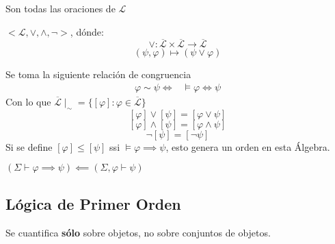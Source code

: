 \begin{defn}
	Son todas las oraciones de $\mathcal{L}$
\end{defn}

\begin{defn}
	$<\mathcal{L},\vee,\wedge,\neg>$, dónde:
	\[\vee:\overline{\mathcal{L}}\times\overline{\mathcal{L}}\rightarrow\overline{\mathcal{L}}\]
	\[(\psi,\varphi)\mapsto(\psi\vee\varphi)\]
\end{defn}

\begin{defn}
	Se toma la siguiente relación de congruencia
	\begin{align*}
		\varphi\sim\psi\iff & \models\varphi\iff\psi
	\end{align*}
	Con lo que $\overline{\mathcal{L}}\mid_\sim=\{[\varphi]:\varphi\in\overline{\mathcal{L}}\}$
	\[[\varphi]\vee[\psi]=[\varphi\vee\psi]\]
	\[[\varphi]\wedge[\psi]=[\varphi\wedge\psi]\]
	\[\neg[\psi]=[\neg\psi]\]
	Si se define $[\varphi]\leq[\psi]$ ssi $\models\varphi\implies\psi$, esto genera un orden en esta Álgebra.
\end{defn}
\begin{thm}
	$(\Sigma\vdash\varphi\implies\psi)\impliedby(\Sigma,\varphi\vdash\psi)$
\end{thm}

\subsection{Lógica de Primer Orden}
Se cuantifica \textbf{sólo} sobre objetos, no sobre conjuntos de objetos.




